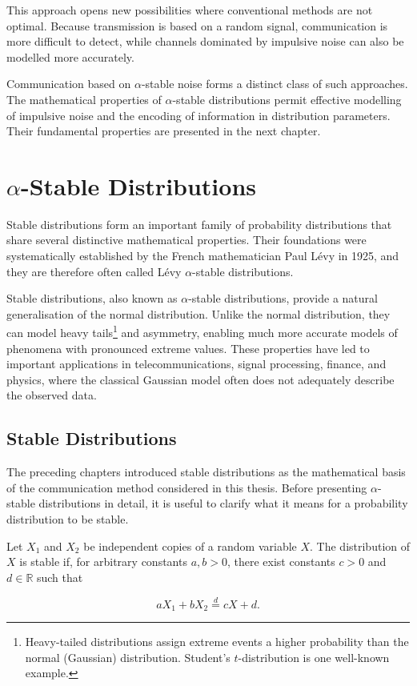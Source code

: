 \documentclass[a4paper, 12pt, openany]{book}
\begin{document}
This approach opens new possibilities where conventional methods are not optimal. Because transmission is based on a random signal, communication is more difficult to detect, while channels dominated by impulsive noise can also be modelled more accurately.

Communication based on $\alpha$-stable noise forms a distinct class of such approaches. The mathematical properties of $\alpha$-stable distributions permit effective modelling of impulsive noise and the encoding of information in distribution parameters. Their fundamental properties are presented in the next chapter.


\chapter{$\alpha$-Stable Distributions}
\label{ch1}
Stable distributions form an important family of probability distributions that share several distinctive mathematical properties. Their foundations were systematically established by the French mathematician Paul Lévy in 1925, and they are therefore often called Lévy $\alpha$-stable distributions.

Stable distributions, also known as $\alpha$-stable distributions, provide a natural generalisation of the normal distribution. Unlike the normal distribution, they can model heavy tails\footnote{Heavy-tailed distributions assign extreme events a higher probability than the normal (Gaussian) distribution. Student's $t$-distribution is one well-known example.} and asymmetry, enabling much more accurate models of phenomena with pronounced extreme values. These properties have led to important applications in telecommunications, signal processing, finance, and physics, where the classical Gaussian model often does not adequately describe the observed data.

\section{Stable Distributions}
The preceding chapters introduced stable distributions as the mathematical basis of the communication method considered in this thesis. Before presenting $\alpha$-stable distributions in detail, it is useful to clarify what it means for a probability distribution to be stable.

\begin{tcolorbox}[colback=blue!5!white,colframe=blue!50!black,title=Definition 1: Stable distribution]
\label{def:stable}

Let $X_1$ and $X_2$ be independent copies of a random variable $X$. The distribution of $X$ is stable if, for arbitrary constants $a,b>0$, there exist constants $c>0$ and $d\in\mathbb{R}$ such that

\[
aX_1+bX_2\overset{d}{=}cX+d.
\]

\end{tcolorbox}
\end{document}
